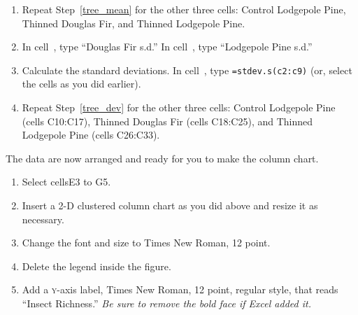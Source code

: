 \documentclass[12pt, hidelinks]{exam}
\newcommand*\xcell[1]{cell~\liningnum{#1}}
\newcommand*\axis[1]{{\scshape #1}-axis}
\begin{document}
\begin{questions}
\begin{enumerate}
	What if you are not sure of the function name? Click on “Formulas” in the ribbon menu. Click on the “Insert Function” icon at the very left of the ribbon. In the dialog box that appears, type “Average” into the area where it says “Search for a function:”. Highlight \texttt{AVERAGE} in the choices and click the “OK” button. Next, a dialog box appears for you to enter the arguments for the \texttt{AVERAGE} function. For the Douglas Fir control sample, you must select cells {\liningnum C2:C9} by clicking and holding on \xcell{C2} and dragging down to \xcell{C9}. The range of cells is added to the dialog box. Press the Enter key or click the “OK” button. If you did this correctly, the value should be 65.875.

	\item Repeat Step~\ref{tree_mean} for the other three cells: Control Lodgepole Pine, Thinned Douglas Fir, and Thinned Lodgepole Pine. 

	\item \label{tree_dev} In \xcell{I3}, type ``Douglas Fir s.d.'' In \xcell{J3}, type ``Lodgepole Pine s.d.''

	\item Calculate the standard deviations. In \xcell{I4}, type \texttt{=stdev.s(c2:c9)} (or, select the cells as you did earlier).

	\item Repeat Step~\ref{tree_dev} for the other three cells: Control Lodgepole Pine (cells {\liningnum C10:C17}), Thinned Douglas Fir (cells {\liningnum C18:C25}), and Thinned Lodgepole Pine (cells {\liningnum C26:C33}). 

\end{enumerate}

The data are now arranged and ready for you to make the column chart.

\begin{enumerate}[resume]
	\item Select cells{\liningnum E3 to G5}.
	
	\item Insert a 2-D clustered column chart as you did above and resize it as necessary.
	
	\item Change the font and size to Times New Roman, 12 point.
	
	\item Delete the legend inside the figure.
	
	\item Add a \axis{y} label, Times New Roman, 12 point, regular style, that reads “Insect Richness.” \emph{Be sure to remove the bold face if Excel added it.}
	

\end{enumerate}
\end{questions}
\end{document}
